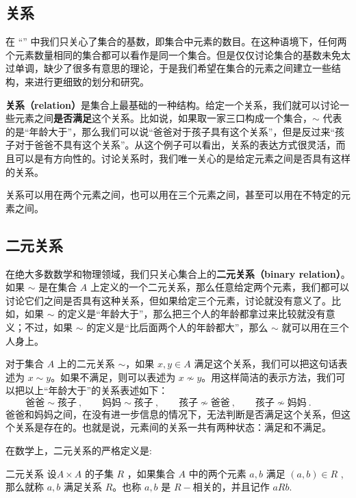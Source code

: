 

\subsection{关系}

在 “” 中我们只关心了集合的基数，即集合中元素的数目。在这种语境下，任何两个元素数量相同的集合都可以看作是同一个集合。但是仅仅讨论集合的基数未免太过单调，缺少了很多有意思的理论，于是我们希望在集合的元素之间建立一些结构，来进行更细致的划分和研究。

\textbf{关系（relation）}是集合上最基础的一种结构。给定一个关系，我们就可以讨论一些元素之间\textbf{是否满足}这个关系。比如说，如果取一家三口构成一个集合，$\sim$ 代表的是“年龄大于”，那么我们可以说“爸爸对于孩子具有这个关系”，但是反过来“孩子对于爸爸不具有这个关系”。从这个例子可以看出，关系的表达方式很灵活，而且可以是有方向性的。讨论关系时，我们唯一关心的是给定元素之间是否具有这样的关系。

关系可以用在两个元素之间，也可以用在三个元素之间，甚至可以用在不特定的元素之间。

\subsection{二元关系}\label{sub_Relat_3}

在绝大多数数学和物理领域，我们只关心集合上的\textbf{二元关系（binary relation）}。如果 $\sim$ 是在集合 $A$ 上定义的一个二元关系，那么任意给定两个元素，我们都可以讨论它们之间是否具有这种关系，但如果给定三个元素，讨论就没有意义了。比如，如果 $\sim$ 的定义是“年龄大于”，那么把三个人的年龄都拿过来比较就没有意义；不过，如果 $\sim$ 的定义是“比后面两个人的年龄都大”，那么 $\sim$ 就可以用在三个人身上。

对于集合 $A$ 上的二元关系 $\sim$，如果 $x, y\in A$ 满足这个关系，我们可以把这句话表述为 $x\sim y$。如果不满足，则可以表述为 $x\not\sim y$。用这样简洁的表示方法，我们可以把以上“年龄大于”的关系表述如下：
\begin{equation}
\text{爸爸}\sim\text{孩子}~, \qquad
\text{妈妈}\sim\text{孩子}~, \qquad
\text{孩子}\not\sim\text{爸爸}~, \qquad
\text{孩子}\not\sim\text{妈妈}~. \qquad
\end{equation}
爸爸和妈妈之间，在没有进一步信息的情况下，无法判断是否满足这个关系，但这个关系是存在的。也就是说，元素间的关系一共有两种状态：满足和不满足。

在数学上，二元关系的严格定义是:
\begin{definition}{二元关系}
设$A \times A$ 的子集 $R$ ，如果集合 $A$ 中的两个元素 $a,b$ 满足 $(a,b) \in R$ ,那么就称 $a,b$ 满足关系 $R$。也称 $a,b$ 是 $R-$相关的，并且记作 $aRb$.
\end{definition}

